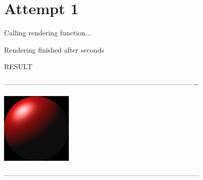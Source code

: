 \documentclass{scrartcl}
\begin{document}
\ExplSyntaxOff



\section*{Attempt 1}

{
\ttfamily


\RenderStat

Calling rendering function...
\def\timeA{}
\def\timeB{}
\GetTime\timeA
{}
\GetTime\timeB

Rendering finished after \GetDuration{\timeA}{\timeB} seconds


\begin{center}

    RESULT

    ----------------------------------------------------------------------------------

    \includegraphics[width=0.4\linewidth]{render1.png}

    -----------------------------------------------------------------------------------
\end{center}
}
\end{document}
